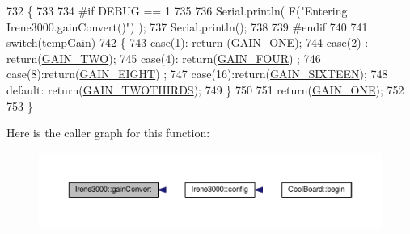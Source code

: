 \begin{DoxyCode}
732 \{
733 
734 \textcolor{preprocessor}{#if DEBUG == 1 }
735 
736     Serial.println( F(\textcolor{stringliteral}{"Entering Irene3000.gainConvert()"}) );
737     Serial.println();
738 
739 \textcolor{preprocessor}{#endif }
740     
741     \textcolor{keywordflow}{switch}(tempGain)
742     \{
743         \textcolor{keywordflow}{case}(1): \textcolor{keywordflow}{return} (\hyperlink{_cool_adafruit___a_d_s1015_8h_a3d6c0e15829a207b9155890811fa4781ab6b0b520637e016e297110bebeb23a54}{GAIN\_ONE});
744         \textcolor{keywordflow}{case}(2) : \textcolor{keywordflow}{return}(\hyperlink{_cool_adafruit___a_d_s1015_8h_a3d6c0e15829a207b9155890811fa4781a447f66a13d0dfbe92462e35f1307cc0d}{GAIN\_TWO});
745         \textcolor{keywordflow}{case}(4): \textcolor{keywordflow}{return}(\hyperlink{_cool_adafruit___a_d_s1015_8h_a3d6c0e15829a207b9155890811fa4781a33fa5521f4e806b7438052fcdbbf8660}{GAIN\_FOUR}) ;   
746         \textcolor{keywordflow}{case}(8):\textcolor{keywordflow}{return}(\hyperlink{_cool_adafruit___a_d_s1015_8h_a3d6c0e15829a207b9155890811fa4781af284da818fc21db27c5ffcfaff7047cb}{GAIN\_EIGHT})  ;  
747         \textcolor{keywordflow}{case}(16):\textcolor{keywordflow}{return}(\hyperlink{_cool_adafruit___a_d_s1015_8h_a3d6c0e15829a207b9155890811fa4781a08fc581748aedabe657bb8aa9464d734}{GAIN\_SIXTEEN});
748         \textcolor{keywordflow}{default}: \textcolor{keywordflow}{return}(\hyperlink{_cool_adafruit___a_d_s1015_8h_a3d6c0e15829a207b9155890811fa4781a879d688347ec0bf159fe1278db602f68}{GAIN\_TWOTHIRDS});  
749     \}
750 
751     \textcolor{keywordflow}{return}(\hyperlink{_cool_adafruit___a_d_s1015_8h_a3d6c0e15829a207b9155890811fa4781ab6b0b520637e016e297110bebeb23a54}{GAIN\_ONE});
752 
753 \}
\end{DoxyCode}
Here is the caller graph for this function\+:\nopagebreak
\begin{figure}[H]
\begin{center}
\leavevmode
\includegraphics[width=350pt]{d6/d03/class_irene3000_abcad62d1201a59f8dd3ba87048002728_icgraph}
\end{center}
\end{figure}
\mbox{\label{class_irene3000_a7bc2414100b5e19eacc6630fa34b2654}} 
